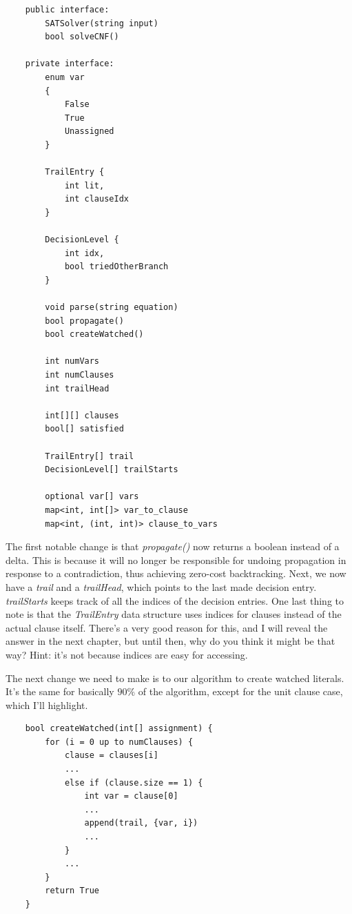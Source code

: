 \documentclass[oneside]{book}
\begin{document}
\begin{lstlisting}
    public interface:
        SATSolver(string input)
        bool solveCNF()

    private interface:
        enum var
        {
            False
            True
            Unassigned
        }

        TrailEntry {
            int lit,
            int clauseIdx
        }

        DecisionLevel {
            int idx,
            bool triedOtherBranch
        }

        void parse(string equation)
        bool propagate()
        bool createWatched()

        int numVars
        int numClauses
        int trailHead

        int[][] clauses
        bool[] satisfied
        
        TrailEntry[] trail
        DecisionLevel[] trailStarts

        optional var[] vars
        map<int, int[]> var_to_clause
        map<int, (int, int)> clause_to_vars
\end{lstlisting}

The first notable change is that \textit{propagate()} now returns a boolean instead 
of a delta. This is because it will no longer be responsible for undoing propagation 
in response to a contradiction, thus achieving zero-cost backtracking. Next, 
we now have a \textit{trail} and a \textit{trailHead}, which points to the last 
made decision entry. \textit{trailStarts} keeps track of all the indices of the 
decision entries. One last thing to note is that the \textit{TrailEntry} data 
structure uses indices for clauses instead of the actual clause itself. 
There's a very good reason for this, and I will reveal the answer in the next chapter,
but until then, why do you think it might be that way? Hint: it's not because 
indices are easy for accessing. 

The next change we need to make is to our algorithm to create watched literals. 
It's the same for basically $90\%$ of the algorithm, except for the unit clause 
case, which I'll highlight.

\begin{lstlisting}
    bool createWatched(int[] assignment) {
        for (i = 0 up to numClauses) {
            clause = clauses[i]
            ...
            else if (clause.size == 1) {
                int var = clause[0]
                ...
                append(trail, {var, i})
                ...
            }
            ...
        }
        return True
    }
\end{lstlisting}
\end{document}
